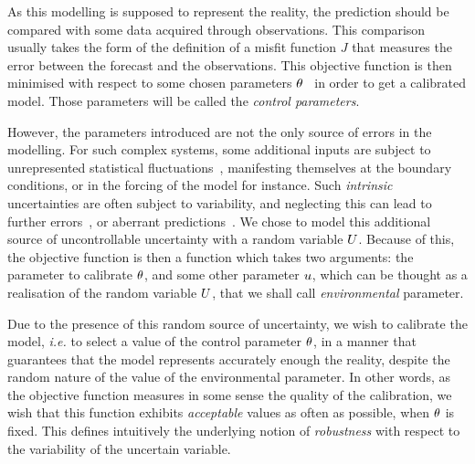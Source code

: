\documentclass[../../Main_ManuscritThese.tex]{subfiles}
\begin{document}
As this modelling is supposed to represent the reality, the prediction
should be compared with some data acquired through observations. This
comparison usually takes the form of the definition of a misfit
function $J$ that measures the error between the forecast and the
observations. This objective function is then minimised with respect to
some chosen parameters
$\theta$~\citep{das_estimation_1991,das_variational_1992,boutet_estimation_2015}
in order to get a calibrated model. Those parameters will be called
the \emph{control parameters}.

However, the parameters introduced are not the only source of errors
in the modelling.  %
For such complex systems, some additional inputs are subject to
unrepresented statistical fluctuations~\citep{zanna_ocean_2011},
manifesting themselves at the boundary conditions, or in the forcing
of the model for instance. Such \emph{intrinsic} uncertainties are
often subject to variability, and neglecting this can lead to further
errors~\citep{mcwilliams_irreducible_2007}, or aberrant
predictions~\citep{kuczera_there_2010}.
We chose to model this
additional source of uncontrollable uncertainty with a random variable
$U$.  Because of this, the objective function is then a function which
takes two arguments: the parameter to calibrate $\theta$,
and some other parameter $u$, which can be thought as a realisation
of the random variable $U$, that we shall call \emph{environmental}
parameter.

Due to the presence of this random source of uncertainty, we wish to
calibrate the model, \emph{i.e.} to select a value of the control
parameter $\theta$, in a manner that guarantees that the model represents
accurately enough the reality, despite the random nature of the value of
the environmental parameter. In other words, as the objective function
measures in some sense the quality of the calibration, we wish that
this function exhibits \emph{acceptable} values as often as possible,
when $\theta$ is fixed. This defines intuitively the underlying notion of
\emph{robustness} with respect to the variability of the uncertain
variable.
\end{document}
